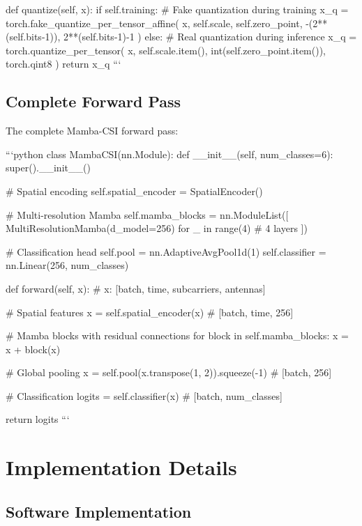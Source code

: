 \documentclass[10pt,journal,compsoc]{IEEEtran}
\begin{document}
    def quantize(self, x):
        if self.training:
            # Fake quantization during training
            x_q = torch.fake_quantize_per_tensor_affine(
                x, self.scale, self.zero_point, 
                -(2**(self.bits-1)), 2**(self.bits-1)-1
            )
        else:
            # Real quantization during inference
            x_q = torch.quantize_per_tensor(
                x, self.scale.item(), int(self.zero_point.item()), 
                torch.qint8
            )
        return x_q
```

\subsection{Complete Forward Pass}

The complete Mamba-CSI forward pass:

```python
class MambaCSI(nn.Module):
    def __init__(self, num_classes=6):
        super().__init__()
        
        # Spatial encoding
        self.spatial_encoder = SpatialEncoder()
        
        # Multi-resolution Mamba
        self.mamba_blocks = nn.ModuleList([
            MultiResolutionMamba(d_model=256)
            for _ in range(4)  # 4 layers
        ])
        
        # Classification head
        self.pool = nn.AdaptiveAvgPool1d(1)
        self.classifier = nn.Linear(256, num_classes)
        
    def forward(self, x):
        # x: [batch, time, subcarriers, antennas]
        
        # Spatial features
        x = self.spatial_encoder(x)  # [batch, time, 256]
        
        # Mamba blocks with residual connections
        for block in self.mamba_blocks:
            x = x + block(x)
        
        # Global pooling
        x = self.pool(x.transpose(1, 2)).squeeze(-1)  # [batch, 256]
        
        # Classification
        logits = self.classifier(x)  # [batch, num_classes]
        
        return logits
```

\section{Implementation Details}
\label{sec:implementation}

\subsection{Software Implementation}
\end{document}
